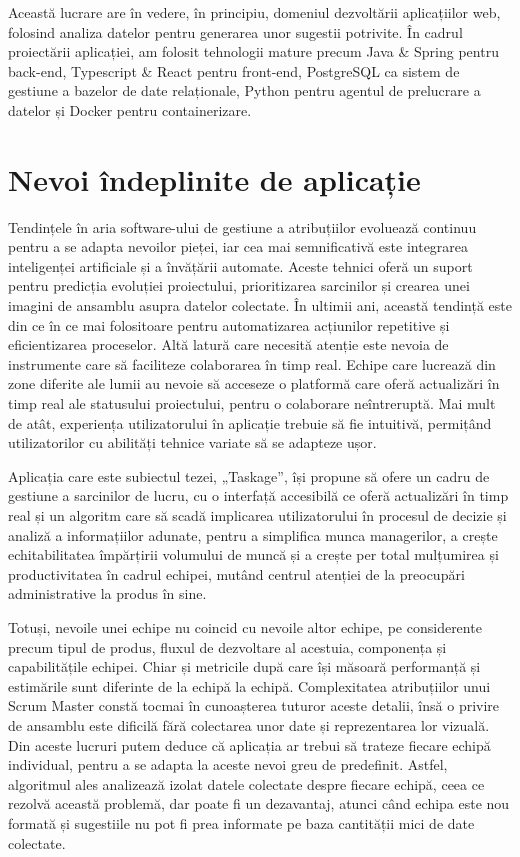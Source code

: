 Această lucrare are în vedere, în principiu, domeniul dezvoltării aplicațiilor web, folosind analiza datelor pentru generarea unor sugestii potrivite. În cadrul proiectării aplicației, am folosit tehnologii mature precum Java \& Spring pentru back-end, Typescript \& React pentru front-end, PostgreSQL ca sistem de gestiune a bazelor de date relaționale, Python pentru agentul de prelucrare a datelor și Docker pentru containerizare.


\section{Nevoi îndeplinite de aplicație}

Tendințele în aria software-ului de gestiune a atribuțiilor evoluează continuu pentru a se adapta nevoilor pieței, iar cea mai semnificativă este integrarea inteligenței artificiale și a învățării automate. Aceste tehnici oferă un suport pentru predicția evoluției proiectului, prioritizarea sarcinilor și crearea unei imagini de ansamblu asupra datelor colectate. În ultimii ani, această tendință este din ce în ce mai folositoare pentru automatizarea acțiunilor repetitive și eficientizarea proceselor\cite{emerging_trends_for_effective_software}. Altă latură care necesită atenție este nevoia de instrumente care să faciliteze colaborarea în timp real. Echipe care lucrează din zone diferite ale lumii au nevoie să acceseze o platformă care oferă actualizări în timp real ale statusului proiectului, pentru o colaborare neîntreruptă. Mai mult de atât, experiența utilizatorului în aplicație trebuie să fie intuitivă, permițând utilizatorilor cu abilități tehnice variate să se adapteze ușor.

Aplicația care este subiectul tezei, „Taskage”, își propune să ofere un cadru de gestiune a sarcinilor de lucru, cu o interfață accesibilă ce oferă actualizări în timp real și un algoritm care să scadă implicarea utilizatorului în procesul de decizie și analiză a informațiilor adunate, pentru a simplifica munca managerilor, a crește echitabilitatea împărțirii volumului de muncă și a crește per total mulțumirea și productivitatea în cadrul echipei, mutând centrul atenției de la preocupări administrative la produs în sine.

Totuși, nevoile unei echipe nu coincid cu nevoile altor echipe, pe considerente precum tipul de produs, fluxul de dezvoltare al acestuia, componența și capabilitățile echipei. Chiar și metricile după care își măsoară performanță și estimările sunt diferinte de la echipă la echipă. Complexitatea atribuțiilor unui Scrum Master constă tocmai în cunoașterea tuturor aceste detalii, însă o privire de ansamblu este dificilă fără colectarea unor date și reprezentarea lor vizuală. Din aceste lucruri putem deduce că aplicația ar trebui să trateze fiecare echipă individual, pentru a se adapta la aceste nevoi greu de predefinit. Astfel, algoritmul ales analizează izolat datele colectate despre fiecare echipă, ceea ce rezolvă această problemă, dar poate fi un dezavantaj, atunci când echipa este nou formată și sugestiile nu pot fi prea informate pe baza cantității mici de date colectate.


